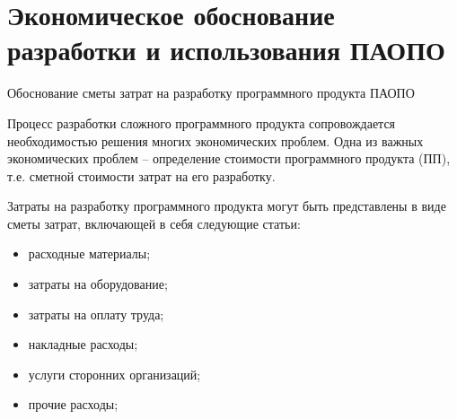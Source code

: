 


\chapter{Экономическое обоснование разработки и использования ПАОПО}


Обоснование сметы  затрат на разработку программного продукта ПАОПО

Процесс разработки сложного программного продукта сопровождается необходимостью решения многих экономических проблем. Одна из важных экономических проблем – определение стоимости программного продукта (ПП), т.е.  сметной стоимости затрат  на его разработку.

Затраты на разработку программного продукта могут быть представлены в виде сметы затрат, включающей в себя следующие статьи:
\begin{itemize}
	\item расходные материалы;
	\item затраты на оборудование;
	\item затраты на оплату труда;
	\item накладные расходы;
	\item услуги сторонних организаций;
	\item прочие расходы;
\end{itemize}
